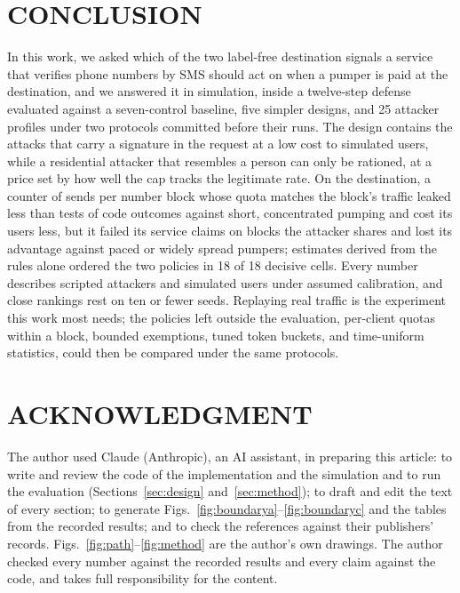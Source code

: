 \documentclass{IEEEoj}
\begin{document}
\section{CONCLUSION}
\label{sec:conclusion}
In this work, we asked which of the two label-free destination signals a service that verifies phone numbers by SMS should act on when a pumper is paid at the destination, and we answered it in simulation, inside a twelve-step defense evaluated against a seven-control baseline, five simpler designs, and 25 attacker profiles under two protocols committed before their runs. The design contains the attacks that carry a signature in the request at a low cost to simulated users, while a residential attacker that resembles a person can only be rationed, at a price set by how well the cap tracks the legitimate rate. On the destination, a counter of sends per number block whose quota matches the block's traffic leaked less than tests of code outcomes against short, concentrated pumping and cost its users less, but it failed its service claims on blocks the attacker shares and lost its advantage against paced or widely spread pumpers; estimates derived from the rules alone ordered the two policies in 18 of 18 decisive cells. Every number describes scripted attackers and simulated users under assumed calibration, and close rankings rest on ten or fewer seeds. Replaying real traffic is the experiment this work most needs; the policies left outside the evaluation, per-client quotas within a block, bounded exemptions, tuned token buckets, and time-uniform statistics, could then be compared under the same protocols.

\section*{ACKNOWLEDGMENT}
The author used Claude (Anthropic), an AI assistant, in preparing this article: to write and review the code of the implementation and the simulation and to run the evaluation (Sections~\ref{sec:design} and~\ref{sec:method}); to draft and edit the text of every section; to generate Figs.~\ref{fig:boundarya}--\ref{fig:boundaryc} and the tables from the recorded results; and to check the references against their publishers' records. Figs.~\ref{fig:path}--\ref{fig:method} are the author's own drawings. The author checked every number against the recorded results and every claim against the code, and takes full responsibility for the content.
\end{document}
